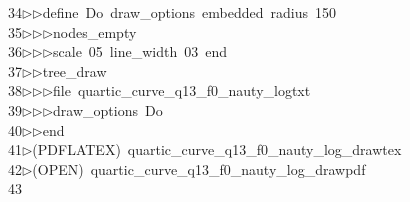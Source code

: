 \begin{tabbing}
34\>$\triangleright$\>$\triangleright$\>define\ Do\ draw\_options\ embedded\ radius\ 150\ \\[0pt]
35\>$\triangleright$\>$\triangleright$\>$\triangleright$\>nodes\_empty\ \\[0pt]
36\>$\triangleright$\>$\triangleright$\>$\triangleright$\>scale\ 05\ line\_width\ 03\ end\ \\[0pt]
37\>$\triangleright$\>$\triangleright$\>tree\_draw\ \\[0pt]
38\>$\triangleright$\>$\triangleright$\>$\triangleright$\>file\ quartic\_curve\_q13\_f0\_nauty\_logtxt\ \\[0pt]
39\>$\triangleright$\>$\triangleright$\>$\triangleright$\>draw\_options\ Do\ \\[0pt]
40\>$\triangleright$\>$\triangleright$\>end\\[0pt]
41\>$\triangleright$\>(PDFLATEX)\ quartic\_curve\_q13\_f0\_nauty\_log\_drawtex\\[0pt]
42\>$\triangleright$\>(OPEN)\ quartic\_curve\_q13\_f0\_nauty\_log\_drawpdf\\[0pt]
43\>\end{tabbing}
